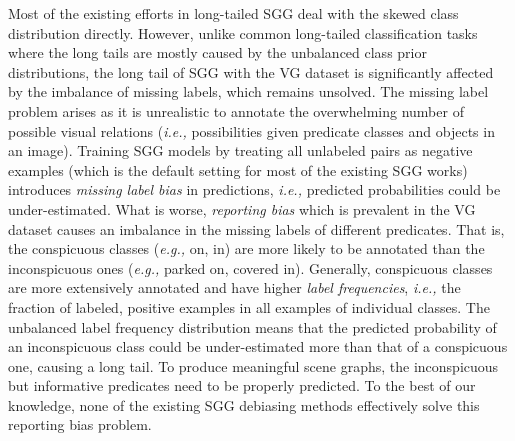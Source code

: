 \documentclass[sigconf]{acmart}
\begin{document}
Most of the existing efforts in long-tailed SGG \cite{chen2019scene,tang2020unbiased,yan2020pcpl,DBLP:conf/bmvc/WangPL20,10.1145/3394171.3413575,he2020learning} deal with the skewed class distribution directly.
However, unlike common long-tailed classification tasks where the long tails are mostly caused by the unbalanced class prior distributions, the long tail of SGG with the VG dataset is significantly affected by the imbalance of missing labels, which remains unsolved.
The missing label problem arises as it is unrealistic to annotate the overwhelming number of possible visual relations (\emph{i.e.,}  possibilities given  predicate classes and  objects in an image).
Training SGG models by treating all unlabeled pairs as negative examples (which is the default setting for most of the existing SGG works) introduces \textit{missing label bias} in predictions, \emph{i.e.,} predicted probabilities could be under-estimated.
What is worse, \textit{reporting bias} \cite{misra2016seeing,tang2020unbiased} which is prevalent in the VG dataset causes an imbalance in the missing labels of different predicates.
That is, the conspicuous classes (\emph{e.g.,} {\selectfont on}, {\selectfont in}) are more likely to be annotated than the inconspicuous ones (\emph{e.g.,} {\selectfont parked on}, {\selectfont covered in}).
Generally, conspicuous classes are more extensively annotated and have higher \textit{label frequencies}, \emph{i.e.,} the fraction of labeled, positive examples in all examples of individual classes.
The unbalanced label frequency distribution means that the predicted probability of an inconspicuous class could be under-estimated more than that of a conspicuous one, causing a long tail.
To produce meaningful scene graphs, the inconspicuous but informative predicates need to be properly predicted.
To the best of our knowledge, none of the existing SGG debiasing methods \cite{chen2019scene,tang2020unbiased,yan2020pcpl,DBLP:conf/bmvc/WangPL20,10.1145/3394171.3413575,he2020learning} effectively solve this reporting bias problem.
\end{document}

